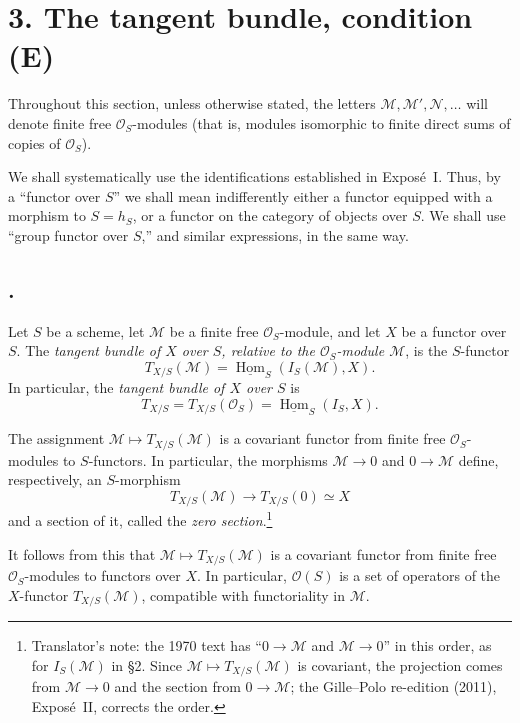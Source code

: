 
\section*{3. The tangent bundle, condition (E)}

Throughout this section, unless otherwise stated, the letters
\(\mathcal M,\mathcal M',\mathcal N,\ldots\) will denote finite free
\(\mathcal O_S\)-modules (that is, modules isomorphic to finite direct sums
of copies of \(\mathcal O_S\)).

We shall systematically use the identifications established in Expos\'e~I.
Thus, by a ``functor over \(S\)'' we shall mean indifferently either a
functor equipped with a morphism to \(S=h_S\), or a functor on the category
of objects over \(S\). We shall use ``group functor over \(S\),'' and
similar expressions, in the same way.

\subsection*{.}
Let \(S\) be a scheme, let \(\mathcal M\) be a finite free
\(\mathcal O_S\)-module, and let \(X\) be a functor over \(S\). The
\emph{tangent bundle of \(X\) over \(S\), relative to the
\(\mathcal O_S\)-module \(\mathcal M\)}, is the \(S\)-functor
\[
  T_{X/S}(\mathcal M)
  =\underline{\operatorname{Hom}}_S(I_S(\mathcal M),X).
\]
In particular, the \emph{tangent bundle of \(X\) over \(S\)} is
\[
  T_{X/S}=T_{X/S}(\mathcal O_S)
  =\underline{\operatorname{Hom}}_S(I_S,X).
\]

The assignment \(\mathcal M\mapsto T_{X/S}(\mathcal M)\) is a covariant
functor from finite free \(\mathcal O_S\)-modules to \(S\)-functors. In
particular, the morphisms \(\mathcal M\to0\) and \(0\to\mathcal M\)
define, respectively, an \(S\)-morphism
\[
  T_{X/S}(\mathcal M)\longrightarrow
  T_{X/S}(0)\simeq X
\]
and a section of it, called the \emph{zero section}.\footnote{Translator's
note: the 1970 text has ``\(0\to\mathcal M\) and \(\mathcal M\to0\)'' in
this order, as for \(I_S(\mathcal M)\) in \S2. Since
\(\mathcal M\mapsto T_{X/S}(\mathcal M)\) is covariant, the projection comes
from \(\mathcal M\to0\) and the section from \(0\to\mathcal M\); the
Gille--Polo re-edition (2011), Expos\'e~II, corrects the order.}

It follows from this that \(\mathcal M\mapsto T_{X/S}(\mathcal M)\) is a
covariant functor from finite free \(\mathcal O_S\)-modules to functors
over \(X\). In particular, \(\mathcal O(S)\) is a set of operators of the
\(X\)-functor \(T_{X/S}(\mathcal M)\), compatible with functoriality in
\(\mathcal M\).

